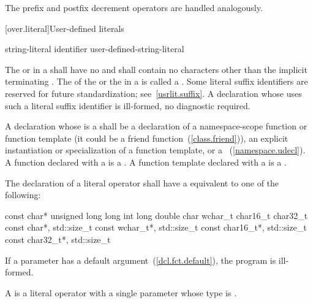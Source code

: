 \pnum
The prefix and postfix decrement operators
\tcode{-{-}}
are handled analogously.

[over.literal]{User-defined literals}%
%

\begin{bnf}
\br
     string-literal identifier\br
     user-defined-string-literal
\end{bnf}

\pnum
The  or 
in a  shall have no
 and shall contain no characters other than the
implicit terminating .
The  of the  or
the  in a  is called a
.
Some literal suffix identifiers are reserved for future standardization;
see~\ref{usrlit.suffix}.  A declaration whose  uses
such a literal suffix identifier is ill-formed, no diagnostic required.

\pnum
A declaration whose  is a
 shall be a declaration of a namespace-scope
function or function template (it could be a friend
function~(\ref{class.friend})), an explicit instantiation or specialization of a
function template, or a ~(\ref{namespace.udecl}).
A function declared with a  is a . A function template declared with a 
is a .

\pnum
The declaration of a literal operator shall have a
 equivalent to one of the following:

\begin{codeblock}
const char*
unsigned long long int
long double
char
wchar_t
char16_t
char32_t
const char*, std::size_t
const wchar_t*, std::size_t
const char16_t*, std::size_t
const char32_t*, std::size_t
\end{codeblock}

If a parameter has a default argument~(\ref{dcl.fct.default}), the program is
ill-formed.

\pnum
A  is a literal operator with a single parameter
whose type is .

